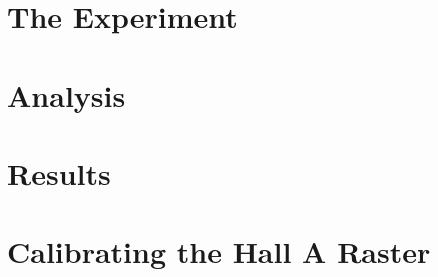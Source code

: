 \documentclass[11pt]{ksudiss}                          %
\begin{document}
\chapter{\bf{The Experiment}}    %


\chapter{\bf{Analysis}}    %


\chapter{\bf{Results}}    %



%
%
%


%
%
%
%
%

\printbibliography


\appendix

\chapter{\bf{Calibrating the Hall A Raster}}\label{raster_appendix}

\end{document}

